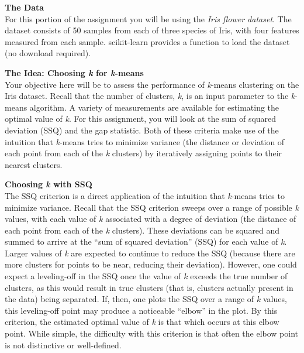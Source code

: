 \documentclass[paper=a4, fontsize=11pt]{scrartcl} %
\numberwithin{equation}{section} %
\numberwithin{figure}{section} %
\numberwithin{table}{section} %
\begin{document}
\textbf{The Data}\\
For this portion of the assignment you will be using the \textit{Iris flower dataset}. The dataset consists of 50 samples from each of three species of Iris, with four features measured from each sample. scikit-learn provides a function to load the dataset (no download required).

\vspace{6pt}

\textbf{The Idea:  Choosing \textit{k} for \textit{k}-means}\\
Your objective here will be to assess the performance of \textit{k}-means clustering on the Iris dataset. Recall that the number of clusters, \textit{k}, is an input parameter to the \textit{k}-means algorithm. A variety of measurements are available for estimating the optimal value of \textit{k}. For this assignment, you will look at the sum of squared deviation (SSQ) and the gap statistic. Both of these criteria make use of the intuition that \textit{k}-means tries to minimize variance (the distance or deviation of each point from each of the \textit{k} clusters) by iteratively assigning points to their nearest clusters.

\vspace{8pt}

\textbf{Choosing \textit{k} with SSQ}\\
The SSQ criterion is a direct application of the intuition that \textit{k}-means tries to minimize variance. Recall that the SSQ criterion sweeps over a range of possible \textit{k} values, with each value of \textit{k} associated with a degree of deviation (the distance of each point from each of the \textit{k} clusters). These deviations can be squared and summed to arrive at the ``sum of squared deviation'' (SSQ) for each value of \textit{k}. Larger values of \textit{k} are expected to continue to reduce the SSQ (because there are more clusters for points to be near, reducing their deviation). However, one could expect a leveling-off in the SSQ once the value of \textit{k} exceeds the true number of clusters, as this would result in true clusters (that is, clusters actually present in the data) being separated. If, then, one plots the SSQ over a range of \textit{k} values, this leveling-off point may produce a noticeable ``elbow'' in the plot. By this criterion, the estimated optimal value of \textit{k} is that which occurs at this elbow point. While simple, the difficulty with this criterion is that often the elbow point is not distinctive or well-defined.
\end{document}
